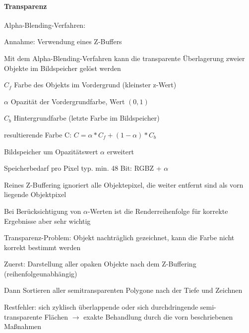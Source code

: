 \documentclass[landscape]{article}
\begin{document}
\begin{multicols}{3}
  \paragraph{Transparenz}
  Alpha-Blending-Verfahren:
  \begin{itemize*}
    \item Annahme: Verwendung eines Z-Buffers
    \item Mit dem Alpha-Blending-Verfahren kann die transparente Überlagerung zweier Objekte im Bildspeicher gelöst werden
    \item $C_f$ Farbe des Objekts im Vordergrund (kleinster z-Wert)
    \item $\alpha$ Opazität der Vordergrundfarbe, Wert $(0,1)$
    \item $C_b$ Hintergrundfarbe (letzte Farbe im Bildspeicher)
    \item resultierende Farbe C: $C=\alpha*C_f+(1-\alpha)*C_b$
    \item Bildspeicher um  Opazitätswert $\alpha$ erweitert
    \item Speicherbedarf pro Pixel typ. min. 48 Bit: RGBZ + $\alpha$
    \item Reines Z-Buffering ignoriert alle Objektepixel, die weiter entfernt sind als vorn liegende Objektpixel
    \item Bei Berücksichtigung von $\alpha$-Werten ist die Renderreihenfolge für korrekte Ergebnisse aber sehr wichtig
    \item Transparenz-Problem: Objekt nachträglich gezeichnet, kann die Farbe nicht korrekt bestimmt werden
    \item Zuerst: Darstellung aller opaken Objekte nach dem Z-Buffering (reihenfolgeunabhängig)
    \item Dann Sortieren aller semitransparenten Polygone nach der Tiefe und Zeichnen
    \item Restfehler: sich zyklisch überlappende oder sich durchdringende semi-transparente Flächen $\rightarrow$ exakte Behandlung durch die vorn beschriebenen Maßnahmen
  \end{itemize*}
  
\end{multicols}
\newpage
\end{document}
